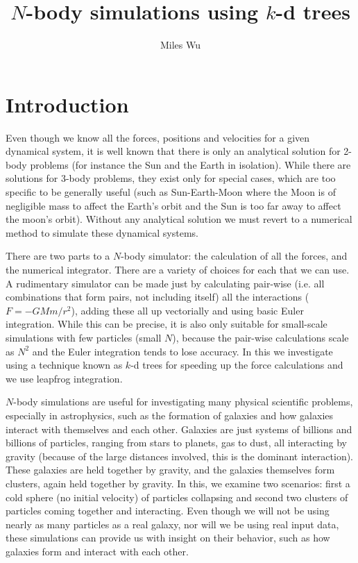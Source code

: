 \documentclass[11pt]{article}
\begin{document}
\title{$N$-body simulations using $k$-d trees}
\author{Miles Wu}
\maketitle

\section{Introduction}
Even though we know all the forces, positions and velocities for a given dynamical system, it is well known that there is only an analytical solution for 2-body problems (for instance the Sun and the Earth in isolation).
While there are solutions for 3-body problems, they exist only for special cases, which are too specific to be generally useful (such as Sun-Earth-Moon where the Moon is of negligible mass to affect the Earth's orbit and the Sun is too far away to affect the moon's orbit).
Without any analytical solution we must revert to a numerical method to simulate these dynamical systems.

There are two parts to a $N$-body simulator: the calculation of all the forces, and the numerical integrator. 
There are a variety of choices for each that we can use.
A rudimentary simulator can be made just by calculating pair-wise (i.e. all combinations that form pairs, not including itself) all the interactions ($F = - GMm/r^2$), adding these all up vectorially and using basic Euler integration.
While this can be precise, it is also only suitable for small-scale simulations with few particles (small $N$), because the pair-wise calculations scale as $N^2$ and the Euler integration tends to lose accuracy. 
In this we investigate using a technique known as $k$-d trees for speeding up the force calculations and we use leapfrog integration.

$N$-body simulations are useful for investigating many physical scientific problems, especially in astrophysics, such as the formation of galaxies and how galaxies interact with themselves and each other.
Galaxies are just systems of billions and billions of particles, ranging from stars to planets, gas to dust, all interacting by gravity (because of the large distances involved, this is the dominant interaction).
These galaxies are held together by gravity, and the galaxies themselves form clusters, again held together by gravity.
In this, we examine two scenarios: first a cold sphere (no initial velocity) of particles collapsing and second two clusters of particles coming together and interacting.
Even though we will not be using nearly as many particles as a real galaxy, nor will we be using real input data, these simulations can provide us with insight on their behavior, such as how galaxies form and interact with each other.
\end{document}
